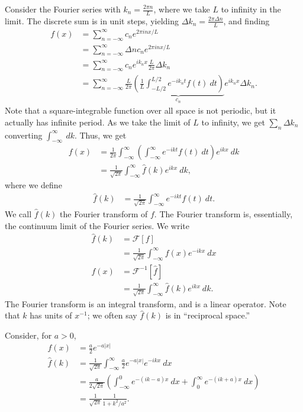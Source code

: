 \documentclass[10pt]{mypackage}
\begin{document}
Consider the Fourier series with $k_n = \frac{2\pi n}{L}$, where we take $L$ to infinity in the limit. The discrete sum is in unit steps, yielding $\Delta k_n = \frac{2\pi \Delta n}{L}$, and finding
\begin{align*}
  f(x) &= \sum_{n=-\infty}^{\infty}c_ne^{2\pi i n x/L}\\
       &= \sum_{n=-\infty}^{\infty}\Delta n c_n e^{2\pi i n x /L}\\
       &= \sum_{n=-\infty}^{\infty}c_ne^{i k_n x}\frac{L}{2\pi}\Delta k_n\\
       &= \sum_{n=-\infty}^{\infty}\frac{L}{2\pi}\underbrace{\left(\frac{1}{L}\int_{-L/2}^{L/2} e^{-ik_n t}f(t)\:dt\right)}_{c_n}e^{ik_n x}\Delta k_n.
\end{align*}
Note that a square-integrable function over all space is not periodic, but it actually has infinite period. As we take the limit of $L$ to infinity, we get $\sum_{n}\Delta k_n$ converting $\int_{-\infty}^{\infty} \:dk$. Thus, we get
\begin{align*}
  f(x) &= \frac{1}{2\pi}\int_{-\infty}^{\infty} \left(\int_{-\infty}^{\infty} e^{-ikt}f(t)\:dt\right)e^{ikx}\:dk\\
       &= \frac{1}{\sqrt{2\pi}}\int_{-\infty}^{\infty} \widehat{f}(k)e^{ikx}\:dk,
\end{align*}
where we define
\begin{align*}
  \widehat{f}(k) &= \frac{1}{\sqrt{2\pi}}\int_{-\infty}^{\infty} e^{-ikt}f(t)\:dt.
\end{align*}
We call $\widehat{f}(k)$ the Fourier transform of $f$. The Fourier transform is, essentially, the continuum limit of the Fourier series. We write
\begin{align*}
  \widehat{f}(k) &= \mathcal{F}\left[f\right]\\
             &= \frac{1}{\sqrt{2\pi}}\int_{-\infty}^{\infty} f(x)e^{-ikx}\:dx\\
  f(x) &= \mathcal{F}^{-1}\left[\widehat{f}\right]\\
       &= \frac{1}{\sqrt{2\pi}} \int_{-\infty}^{\infty} \widehat{f}(k)e^{ikx}\:dk.
\end{align*}
The Fourier transform is an integral transform, and is a linear operator. Note that $k$ has units of $x^{-1}$; we often say $\widehat{f}(k)$ is in ``reciprocal space.''
\begin{example}
  Consider, for $a > 0$,
  \begin{align*}
    f(x) &= \frac{a}{2}e^{-a|x|}\\
    \widehat{f}(k) &= \frac{1}{\sqrt{2\pi}}\int_{-\infty}^{\infty} \frac{a}{2}e^{-a|x|}e^{-ikx}\:dx\\
               &= \frac{a}{2\sqrt{2\pi}}\left(\int_{-\infty}^{0} e^{-\left(ik-a\right)x}\:dx + \int_{0}^{\infty} e^{-\left(ik+a\right)x}\:dx\right)\\
               &= \frac{1}{\sqrt{2\pi}}\frac{1}{1 + k^2/a^2}.
  \end{align*}
\end{example}
\end{document}
